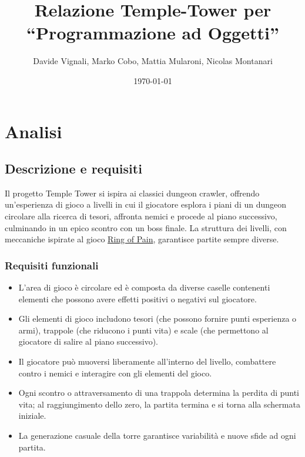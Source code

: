 \documentclass[a4paper,12pt]{report}
\title{Relazione Temple-Tower per\\``Programmazione ad Oggetti''}
\author{Davide Vignali, Marko Cobo, Mattia Mularoni, Nicolas Montanari}
\date{\today}
\begin{document}
\maketitle

\tableofcontents

\chapter{Analisi}

\section{Descrizione e requisiti}

Il progetto Temple Tower si ispira ai classici dungeon crawler, offrendo un'esperienza di gioco a livelli in cui il giocatore esplora i piani di un dungeon circolare alla ricerca di tesori, affronta nemici e procede al piano successivo, culminando in un epico scontro con un boss finale.
%
La struttura dei livelli, con meccaniche ispirate al gioco \href{https://ring-of-pain.fandom.com/wiki/Ring_of_Pain_Wiki}{Ring of Pain}, garantisce partite sempre diverse.

\subsection*{Requisiti funzionali}
\begin{itemize}
	\item L'area di gioco è circolare ed è composta da diverse caselle contenenti elementi che possono avere effetti positivi o negativi sul giocatore.
	\item Gli elementi di gioco includono tesori (che possono fornire punti esperienza o armi), trappole (che riducono i punti vita) e scale (che permettono al giocatore di salire al piano successivo).
	\item Il giocatore può muoversi liberamente all'interno del livello, combattere contro i nemici e interagire con gli elementi del gioco.
	\item Ogni scontro o attraversamento di una trappola determina la perdita di punti vita; al raggiungimento dello zero, la partita termina e si torna alla schermata iniziale.
    \item La generazione casuale della torre garantisce variabilità e nuove sfide ad ogni partita.
\end{itemize}
\end{document}
